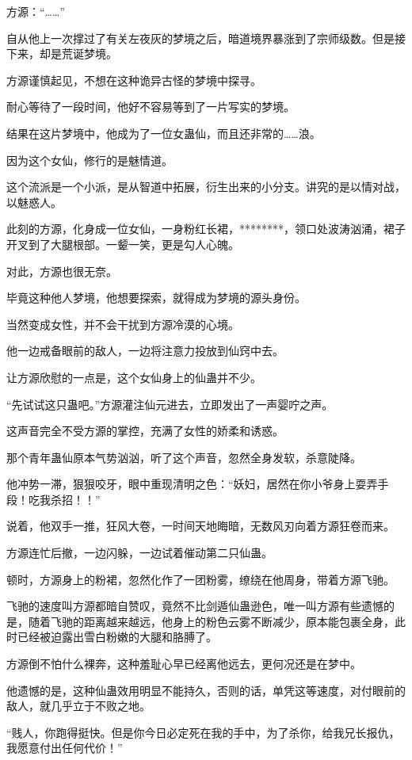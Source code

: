 \begin{this_body}
方源：“……”

自从他上一次撑过了有关左夜灰的梦境之后，暗道境界暴涨到了宗师级数。但是接下来，却是荒诞梦境。

方源谨慎起见，不想在这种诡异古怪的梦境中探寻。

耐心等待了一段时间，他好不容易等到了一片写实的梦境。

结果在这片梦境中，他成为了一位女蛊仙，而且还非常的……浪。

因为这个女仙，修行的是魅情道。

这个流派是一个小派，是从智道中拓展，衍生出来的小分支。讲究的是以情对战，以魅惑人。

此刻的方源，化身成一位女仙，一身粉红长裙，********，领口处波涛汹涌，裙子开叉到了大腿根部。一颦一笑，更是勾人心魄。

对此，方源也很无奈。

毕竟这种他人梦境，他想要探索，就得成为梦境的源头身份。

当然变成女性，并不会干扰到方源冷漠的心境。

他一边戒备眼前的敌人，一边将注意力投放到仙窍中去。

让方源欣慰的一点是，这个女仙身上的仙蛊并不少。

“先试试这只蛊吧。”方源灌注仙元进去，立即发出了一声婴咛之声。

这声音完全不受方源的掌控，充满了女性的娇柔和诱惑。

那个青年蛊仙原本气势汹汹，听了这个声音，忽然全身发软，杀意陡降。

他冲势一滞，狠狠咬牙，眼中重现清明之色：“妖妇，居然在你小爷身上耍弄手段！吃我杀招！！”

说着，他双手一推，狂风大卷，一时间天地晦暗，无数风刃向着方源狂卷而来。

方源连忙后撤，一边闪躲，一边试着催动第二只仙蛊。

顿时，方源身上的粉裙，忽然化作了一团粉雾，缭绕在他周身，带着方源飞驰。

飞驰的速度叫方源都暗自赞叹，竟然不比剑遁仙蛊逊色，唯一叫方源有些遗憾的是，随着飞驰的距离越来越远，他身上的粉色云雾不断减少，原本能包裹全身，此时已经被迫露出雪白粉嫩的大腿和胳膊了。

方源倒不怕什么裸奔，这种羞耻心早已经离他远去，更何况还是在梦中。

他遗憾的是，这种仙蛊效用明显不能持久，否则的话，单凭这等速度，对付眼前的敌人，就几乎立于不败之地。

“贱人，你跑得挺快。但是你今日必定死在我的手中，为了杀你，给我兄长报仇，我愿意付出任何代价！”


\end{this_body}

